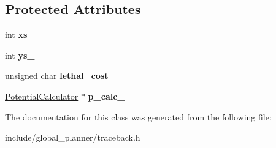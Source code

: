 \subsection*{Protected Attributes}
\begin{DoxyCompactItemize}
\item 
\mbox{\label{classglobal__planner_1_1_traceback_a062d8297437fb132a87a9adff70c2c8f}} 
int {\bfseries xs\+\_\+}
\item 
\mbox{\label{classglobal__planner_1_1_traceback_a1d7c2fd48b6d48696ee7fcd650e5cc4b}} 
int {\bfseries ys\+\_\+}
\item 
\mbox{\label{classglobal__planner_1_1_traceback_a61b0a5a5dfb61d942d2dfd7c0d7a58ea}} 
unsigned char {\bfseries lethal\+\_\+cost\+\_\+}
\item 
\mbox{\label{classglobal__planner_1_1_traceback_a918825f1ecb2858a3b4a6d516ad144b4}} 
\mbox{\hyperlink{classglobal__planner_1_1_potential_calculator}{Potential\+Calculator}} $\ast$ {\bfseries p\+\_\+calc\+\_\+}
\end{DoxyCompactItemize}


The documentation for this class was generated from the following file\+:\begin{DoxyCompactItemize}
\item 
include/global\+\_\+planner/traceback.\+h\end{DoxyCompactItemize}
